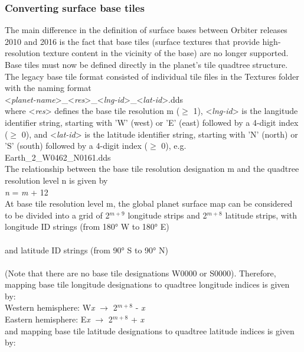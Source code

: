 \documentclass[Orbiter Developer Manual.tex]{subfiles}
\begin{document}
\subsubsection{Converting surface base tiles}
The main difference in the definition of surface bases between Orbiter releases 2010 and 2016 is the fact that base tiles (surface textures that provide high-resolution texture content in the vicinity of the base) are no longer supported. Base tiles must now be defined directly in the planet's tile quadtree structure.\\
The legacy base tile format consisted of individual tile files in the Textures folder with the naming format\\
\indent <\textit{planet-name}>\_<\textit{res}>\_<\textit{lng-id}>\_<\textit{lat-id}>.dds\\
where <\textit{res}> defines the base tile resolution m ($\geq$ 1), <\textit{lng-id}> is the langitude identifier string, starting with 'W' (west) or 'E' (east) followed by a 4-digit index ($\geq$ 0), and <\textit{lat-id}> is the latitude identifier string, starting with 'N' (north) or 'S' (south) followed by a 4-digit index ($\geq$ 0), e.g.\\
\indent Earth\_2\_W0462\_N0161.dds\\
The relationship between the base tile resolution designation m and the quadtree resolution level n is given by\\
\indent \textit{n} = \textit{m} + 12\\
At base tile resolution level m, the global planet surface map can be considered to be divided into a grid of 2$^{m+9}$ longitude strips and 2$^{m+8}$ latitude strips, with longitude ID strings (from 180° W to 180° E)\\
\indent [W2$^{m+8}$, ... , W0001, E0000, E2$^{m+8}$-1]\\
and latitude ID strings (from 90° S to 90° N)\\
\indent [S2$^{m+7}$, ... , S0001, N0000, N2$^{m+7}$-1]\\
(Note that there are no base tile designations W0000 or S0000). Therefore, mapping base tile longitude designations to quadtree longitude indices is given by:\\
\indent Western hemisphere: W\textit{x} $\rightarrow$ 2$^{m+8}$ - \textit{x}\\
\indent Eastern hemisphere: E\textit{x} $\rightarrow$ 2$^{m+8}$ + \textit{x}\\
and mapping base tile latitude designations to quadtree latitude indices is given by:\\
\end{document}
